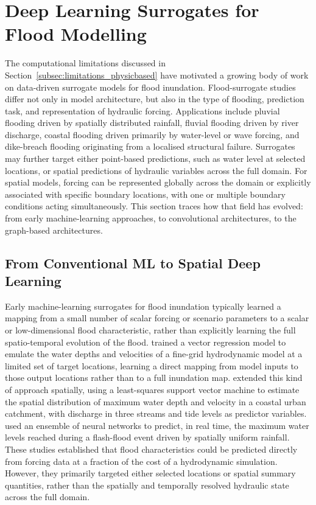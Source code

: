 \documentclass[12pt,a4paper]{report}
\begin{document}
\section{Deep Learning Surrogates for Flood Modelling}
\label{sec:surrogates}
The computational limitations discussed in Section~\ref{subsec:limitations_physicbased}
have motivated a growing body of work on data-driven surrogate models for flood
inundation.
Flood-surrogate studies differ not only in model architecture, but also in the type of flooding, prediction task, and representation of hydraulic forcing. Applications include pluvial flooding driven by spatially distributed rainfall, fluvial flooding driven by river discharge, coastal flooding driven primarily by water-level or wave forcing, and dike-breach flooding originating from a localised structural failure. Surrogates may further target either point-based predictions, such as water level at selected locations, or spatial predictions of hydraulic variables across the full domain. For spatial models, forcing can be represented globally across the domain or explicitly associated with specific boundary locations, with one or multiple boundary conditions acting simultaneously. 
This section traces how that field has evolved: from early machine-learning
approaches, to
convolutional architectures, to the
graph-based architectures.
 
\subsection{From Conventional ML to Spatial Deep Learning}
\label{subsec:conventional_ml}
 
Early machine-learning surrogates for flood inundation typically learned a mapping from
a small number of scalar forcing or scenario parameters to a scalar or low-dimensional
flood characteristic, rather than explicitly learning the full spatio-temporal
evolution of the flood. \citet{liu2015svr} trained a vector regression model to
emulate the water depths and velocities of a fine-grid hydrodynamic model at a limited
set of target locations, learning a direct mapping from model inputs to those output
locations rather than to a full inundation map. \citet{bermudez2019lssvm} extended this
kind of approach spatially, using a least-squares support vector machine to estimate the
spatial distribution of maximum water depth and velocity in a coastal urban catchment,
with discharge in three streams and tide levels as predictor variables.
\citet{berkhahn2019ensemble} used an ensemble of neural networks to predict, in
real time, the maximum water levels reached during a flash-flood event driven by
spatially uniform rainfall. These studies established that flood characteristics could be predicted directly from forcing data at a fraction of the cost of a hydrodynamic simulation. However, they primarily targeted either selected locations or spatial summary quantities, rather than the spatially and temporally resolved hydraulic state across the full domain.
 
\end{document}
